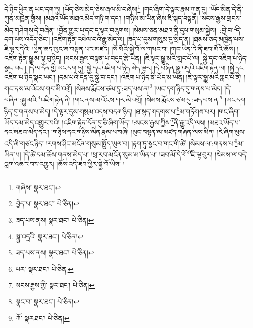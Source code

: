 དེ་ཉིད་ཕྱིར་ན་ཡང་དག་ཏུ། །ཡོད་ཅེས་མེད་ཅེས་ཞལ་མི་བཞེས།\footnote{གཞེས།  སྣར་ཐང་། } །གང་ཞིག་དེ་ལྟར་རྣམ་ཀུན་དུ། །ཡོད་མིན་དེ་ནི་ཀུན་མཁྱེན་གྱིས། །མཐའ་ཡོད་མཐའ་མེད་གཉི་ག་དང་། །གཉིས་མ་ཡིན་ཞེས་ཇི་སྐད་བསྟན། །སངས་རྒྱས་གྲངས་མེད་གཤེགས་དེ་བཞིན། །བྱོན་གྱུར་པ་དང་ད་ལྟར་བཞུགས། །སེམས་ཅན་མཐའ་ནི་དུས་གསུམ་སྐྱེས། །:བྱེ་བ་\footnote{བྱེད་པ་  སྣར་ཐང་།  པེ་ཅིན། }དེ་དག་ལས་འདོད་ཅིང་། །འཇིག་རྟེན་འཕེལ་བའི་རྒྱུ་མེད་ལ། །ཟད་པ་དུས་གསུམ་དུ་སྲིད་ན། །ཐམས་ཅད་མཁྱེན་པས་ཇི་ལྟར་དེའི། །ཕྱིན་ཆད་ལུང་མ་བསྟན་པར་མཛད། །སོ་སོའི་སྐྱེ་བོ་ལ་གསང་བ། །གང་ཡིན་དེ་ནི་ཟབ་མོའི་ཆོས། །འཇིག་རྟེན་སྒྱུ་མ་ལྟ་བུ་ཉིད། །སངས་རྒྱས་བསྟན་པ་བདུད་རྩི་ཡིན། །ཇི་ལྟར་སྒྱུ་མའི་གླང་པོ་ལ། །སྐྱེ་དང་འཇིག་པ་ཉིད་སྣང་ཡང་། །དེ་ལ་དོན་གྱི་ཡང་དག་ཏུ། །སྐྱེ་དང་འཇིག་པ་ཉིད་མེད་ལྟར། །དེ་བཞིན་སྒྱུ་འདྲའི་འཇིག་རྟེན་ལ། །སྐྱེ་དང་འཇིག་པ་ཉིད་སྣང་ཡང་། །དམ་པའི་དོན་དུ་སྐྱེ་བ་དང་། །འཇིག་པ་ཉིད་ནི་ཡོད་མ་ཡིན། །ཇི་ལྟར་སྒྱུ་མའི་གླང་པོ་ནི། །གང་ནས་མ་འོངས་གར་མི་འགྲོ། །སེམས་རྨོངས་ཙམ་དུ་:ཟད་པས་ན།\footnote{ཟད་པས་ནས།  སྣར་ཐང་།  པེ་ཅིན། } །ཡང་དག་ཉིད་དུ་གནས་པ་མེད། །དེ་བཞིན་:སྒྱུ་མའི་\footnote{སྒྱུ་འདྲའི་  སྣར་ཐང་།  པེ་ཅིན། }འཇིག་རྟེན་ནི། །གང་ནས་མ་འོངས་གར་མི་འགྲོ། །སེམས་རྨོངས་ཙམ་དུ་:ཟད་པས་ན།\footnote{ཟད་པས་ནས།  སྣར་ཐང་།  པེ་ཅིན། } །ཡང་དག་ཉིད་དུ་གནས་པ་མེད། །དེ་ལྟར་དུས་གསུམ་འདས་བདག་ཉིད། །ཐ་སྙད་གདགས་པ་\footnote{པར་  སྣར་ཐང་།  པེ་ཅིན། }མ་གཏོགས་པར། །གང་ཞིག་ཡོད་དམ་མེད་འགྱུར་བའི། །འཇིག་རྟེན་དོན་དུ་ཅི་ཞིག་ཡོད། །:སངས་རྒྱས་ཀྱིས་\footnote{སངས་རྒྱས་ཀྱི་  སྣར་ཐང་།  པེ་ཅིན། }ནི་རྒྱུ་འདི་ལས། །མཐའ་ཡོད་པ་དང་མཐའ་མེད་དང་། །གཉིས་དང་གཉིས་མིན་རྣམ་པ་བཞི། །ལུང་བསྟན་མ་མཛད་གཞན་ལས་མིན། །རེ་ཞིག་ལུས་འདི་མི་གཙང་ཉིད། །རགས་ཤིང་མངོན་གསུམ་སྤྱོད་ཡུལ་བ། །རྟག་ཏུ་སྣང་བ་གང་གི་ཚེ། །སེམས་ལ་:གནས་པ་\footnote{སྣང་བ་  སྣར་ཐང་།  པེ་ཅིན། }མ་ཡིན་པ། །དེ་ཚེ་དམ་ཆོས་གནས་མེད་པ། །ཕྲ་རབ་མངོན་སུམ་མ་ཡིན་པ། །ཟབ་མོ་དེ་གོ་\footnote{ཀོ་  སྣར་ཐང་།  པེ་ཅིན། }ཇི་ལྟ་བུར། །སེམས་ལ་བདེ་བླག་འཆར་བར་འགྱུར། །ཆོས་འདི་ཟབ་ཕྱིར་སྐྱེ་བོ་ཡིས། །
